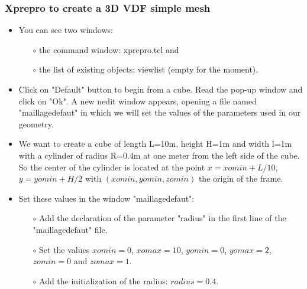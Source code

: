 \documentclass[10pt, hyperref={unicode=true,pdfusetitle, bookmarks=true,bookmarksnumbered=false,bookmarksopen=false, breaklinks=false,pdfborder={0 0 1},backref=true,colorlinks=true,linkcolor=darkblue,pageanchor}]{beamer}
\begin{document}
\begin{frame}
\frametitle{Xprepro to create a 3D VDF simple mesh}
\begin{block}{}

\begin{itemize}
\item You can see two windows: 
    \begin{itemize}
    \item [$\circ$] the command window: xprepro.tcl and 
    \item [$\circ$] the list of existing objects: viewlist (empty for the moment).
    \end{itemize}
\item Click on "Default" button to begin from a cube. Read the pop-up window and click on "Ok". A new nedit window appears, opening a file named "maillagedefaut" in which we will set the values of the parameters used in our geometry.
\item We want to create a cube of length L=10m, height H=1m and width l=1m with a cylinder of radius R=0.4m at one meter from the left side of the cube. So the center of the cylinder is located at the point $x=xomin+L/10$, $y=yomin+H/2$ with $(xomin, yomin, zomin)$ the origin of the frame.
\item Set these values in the window "maillagedefaut":
\begin{itemize}
    \item [$\circ$] Add the declaration of the parameter "radius" in the first line of the "maillagedefaut" file.
    \item [$\circ$] Set the values $xomin=0$, $xomax=10$, $yomin=0$, $yomax=2$, $zomin=0$ and $zomax=1$.
    \item [$\circ$] Add the initialization of the radius: $radius=0.4$.
\end{itemize}
\end{itemize}

\end{block}
\end{frame}
\end{document}
